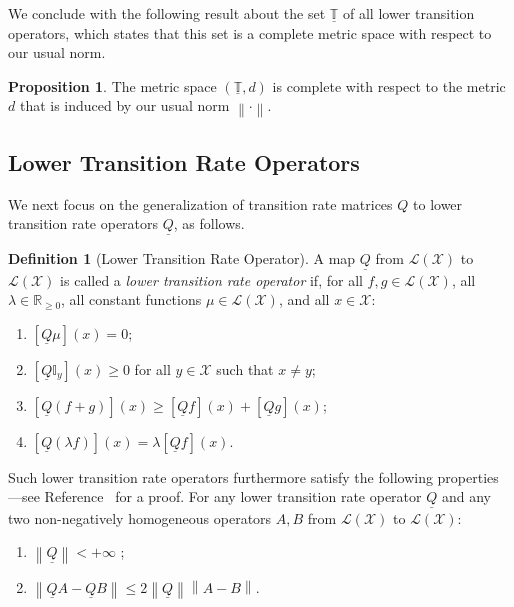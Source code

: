\documentclass[10pt,a4paper]{paper}
\theoremstyle{definition}
\newtheorem{proposition}[theorem]{Proposition}
\newtheorem{definition}{Definition}
\newcommand{\reals}{\mathbb{R}}
\newcommand{\realsnonneg}{\reals_{\geq 0}}
\newcommand{\states}{\mathcal{X}}
\newcommand{\gambles}{\mathcal{L}}
\newcommand{\gamblesX}{\gambles(\states)}
\newcommand{\ind}[1]{\mathbb{I}_{#1}}
\newcommand{\lrate}{\underline{Q}}
\newcommand{\norm}[1]{\left\lVert #1 \right\rVert}
\begin{document}
We conclude with the following result about the set $\underline{\mathbb{T}}$ of all lower transition operators, which states that this set is a complete metric space with respect to our usual norm.

\begin{proposition}\label{lemma:completemetricspace}
The metric space $(\underline{\mathbb{T}},d)$ is complete with respect to the metric $d$ that is induced by our usual norm $\norm{\cdot}$.
\end{proposition}

\subsection{Lower Transition Rate Operators}\label{sec:connections_rate}

We next focus on the generalization of transition rate matrices $Q$ to lower transition rate operators $\lrate$, as follows.
\begin{definition}[Lower Transition Rate Operator]\label{def:coh_low_trans_rate}
A map $\lrate$ from $\gamblesX$ to $\gamblesX$ is called a \emph{lower transition rate operator} if, for all $f,g\in\gamblesX$, all $\lambda\in\realsnonneg$, all constant functions $\mu\in\gamblesX$, and all $x\in\states$:

\begin{enumerate}[label=LR\arabic*:,ref=LR\arabic*]
\item\label{LR:constantzero}
$\left[\lrate\mu\right](x)=0$;
\item\label{LR:nondiagpos}
$\left[\lrate\ind{y}\right](x)\geq0$ for all $y\in\states$ such that $x\neq y$;
\item\label{LR:subadditive}
$\left[\lrate(f+g)\right](x)\geq\left[\lrate f\right](x)+\left[\lrate g\right](x)$;
\item\label{LR:homo}
$\left[\lrate(\lambda f)\right](x)= \lambda\left[\lrate f\right](x)$.
\end{enumerate}
Such lower transition rate operators furthermore satisfy the following properties---see Reference~\cite{DeBock:2016} for a proof. For any lower transition rate operator $\lrate$ and any two non-negatively homogeneous operators $A,B$ from $\gamblesX$ to $\gamblesX$:
\begin{enumerate}[label=LR\arabic*:,ref=LR\arabic*,start=5]
\item
$\norm{\lrate} < +\infty$ \label{LR:normlratefinite};
\item
$\norm{\lrate A - \lrate B} \leq 2\norm{\lrate}\norm{A - B}.$ \label{LR:differenceofnorm}
\end{enumerate}
\vspace{0pt}
\end{definition}
\end{document}
